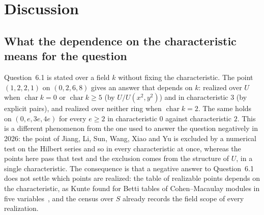 \documentclass[11pt]{article}
\theoremstyle{definition}
\theoremstyle{remark}
\newcommand{\ch}{\operatorname{char}}
\begin{document}
\FloatBarrier
\section{Discussion}
\label{sec:discussion}

\subsection{What the dependence on the characteristic means for the question}

Question~6.1 is stated over a field $k$ without fixing the characteristic. The point $(1,2,2,1)$ on $(0,2,6,8)$ gives an answer that depends on $k$: realized over $U$ when $\ch k=0$ or $\ch k\ge5$ (by $U/U(x^2,y^2)$) and in characteristic $3$ (by explicit pairs), and realized over neither ring when $\ch k=2$. The same holds on $(0,e,3e,4e)$ for every $e\ge2$ in characteristic $0$ against characteristic $2$. This is a different phenomenon from the one used to answer the question negatively in 2026: the point of Jiang, Li, Sun, Wang, Xiao and Yu is excluded by a numerical test on the Hilbert series and so in every characteristic at once, whereas the points here pass that test and the exclusion comes from the structure of $U$, in a single characteristic. The consequence is that a negative answer to Question~6.1 does not settle which points are realized: the table of realizable points depends on the characteristic, as Kunte found for Betti tables of Cohen--Macaulay modules in five variables~\cite{Kunte}, and the census over $S$ already records the field scope of every realization.
\end{document}
